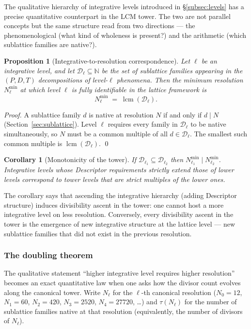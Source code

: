 \documentclass[11pt,a4paper]{article}
\newtheorem{corollary}[theorem]{Corollary}
\newtheorem{proposition}[theorem]{Proposition}
\theoremstyle{definition}
\theoremstyle{remark}
\newcommand{\N}{\mathbb{N}}
\DeclareMathOperator{\lcm}{lcm}
\begin{document}
The qualitative hierarchy of integrative levels introduced in \S\ref{subsec:levels} has a precise quantitative counterpart in the LCM tower. The two are not parallel concepts but the same structure read from two directions --- the phenomenological (what kind of wholeness is present?) and the arithmetic (which sublattice families are native?).

\begin{proposition}[Integrative-to-resolution correspondence]\label{prop:int-resolution}
Let $\ell$ be an integrative level, and let $\mathcal{D}_{\ell}\subseteq\N$ be the set of sublattice families appearing in the $(P,D,T)$ decompositions of level-$\ell$ phenomena. Then the minimum resolution $N_{\ell}^{\min}$ at which level $\ell$ is fully identifiable in the lattice framework is
\[
\boxed{\;N_{\ell}^{\min} \;=\; \lcm(\mathcal{D}_{\ell}).\;}
\]
\end{proposition}

\begin{proof}
A sublattice family $d$ is native at resolution $N$ if and only if $d\mid N$ (Section~\ref{sec:sublattice}). Level $\ell$ requires every family in $\mathcal{D}_{\ell}$ to be native simultaneously, so $N$ must be a common multiple of all $d\in\mathcal{D}_{\ell}$. The smallest such common multiple is $\lcm(\mathcal{D}_{\ell})$. \qed
\end{proof}

\begin{corollary}[Monotonicity of the tower]\label{cor:int-monotone}
If $\mathcal{D}_{\ell_{1}}\subseteq\mathcal{D}_{\ell_{2}}$ then $N_{\ell_{1}}^{\min}\mid N_{\ell_{2}}^{\min}$. Integrative levels whose Descriptor requirements strictly extend those of lower levels correspond to tower levels that are strict multiples of the lower ones.
\end{corollary}

The corollary says that ascending the integrative hierarchy (adding Descriptor structure) induces divisibility ascent in the tower: one cannot host a more integrative level on less resolution. Conversely, every divisibility ascent in the tower is the emergence of new integrative structure at the lattice level --- new sublattice families that did not exist in the previous resolution.

\subsubsection*{The doubling theorem}

The qualitative statement ``higher integrative level requires higher resolution'' becomes an exact quantitative law when one asks how the divisor count evolves along the canonical tower. Write $N_{\ell}$ for the $\ell$-th canonical resolution ($N_{0}=12$, $N_{1}=60$, $N_{2}=420$, $N_{3}=2520$, $N_{4}=27720$, \ldots) and $\tau(N_{\ell})$ for the number of sublattice families native at that resolution (equivalently, the number of divisors of $N_{\ell}$).
\end{document}
